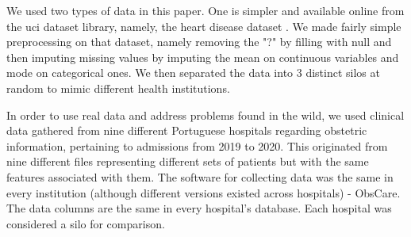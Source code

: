 We used two types of data in this paper. One is simpler and available online from the \ac{uci} dataset library, namely, the heart disease dataset \cite{misc_heart_disease_45}. We made fairly simple preprocessing on that dataset, namely removing the "?" by filling with null and then imputing missing values by imputing the mean on continuous variables and mode on categorical ones. We then separated the data into 3 distinct silos at random to mimic different health institutions.

In order to use real data and address problems found in the wild, we used clinical data gathered from nine different Portuguese hospitals regarding obstetric information, pertaining to admissions from 2019 to 2020. This originated from nine different files representing different sets of patients but with the same features associated with them. The software for collecting data was the same in every institution (although different versions existed across hospitals) - ObsCare. The data columns are the same in every hospital's database. Each hospital was considered a silo for comparison.
